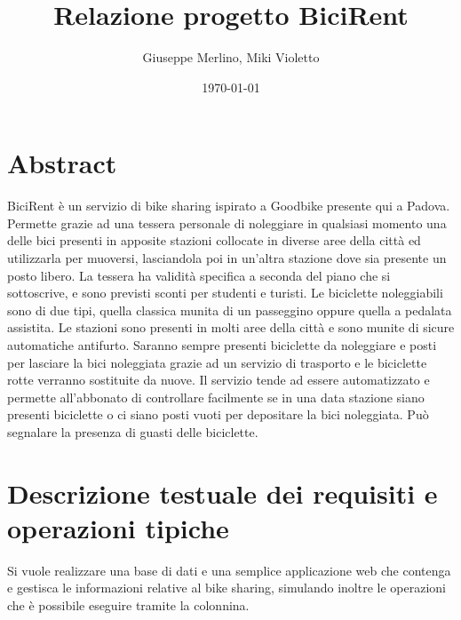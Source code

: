 \documentclass[a4paper,twoside]{article}
\author{Giuseppe Merlino, Miki Violetto}
\title{Relazione progetto BiciRent}
\date{\today}
\begin{document}
\maketitle

\newpage
\tableofcontents
\newpage
\listoffigures
\newpage


\section{Abstract}
BiciRent è un servizio di bike sharing ispirato a Goodbike presente qui a Padova.\newline
Permette grazie ad una tessera personale di noleggiare in qualsiasi momento una delle bici presenti in apposite stazioni collocate in diverse aree della città ed utilizzarla per muoversi, lasciandola poi in un'altra stazione dove sia presente un posto libero.\newline
La tessera ha validità specifica a seconda del piano che si sottoscrive, e sono previsti sconti per studenti e turisti.\newline
Le biciclette noleggiabili sono di due tipi, quella classica munita di un passeggino oppure quella a pedalata assistita.\newline
Le stazioni sono presenti in molti aree della città e sono munite di sicure automatiche antifurto. Saranno sempre presenti biciclette da noleggiare e posti per lasciare la bici noleggiata grazie ad un servizio di trasporto e le biciclette rotte verranno sostituite da nuove.\newline
Il servizio tende ad essere automatizzato e permette all'abbonato di controllare facilmente se in una data stazione siano presenti biciclette o ci siano posti vuoti per depositare la bici noleggiata. Può segnalare la presenza di guasti delle biciclette.\newline

\section{Descrizione testuale dei requisiti e operazioni tipiche}
Si vuole realizzare una base di dati e una semplice applicazione web che contenga e gestisca le informazioni relative al bike sharing, simulando inoltre le operazioni che è possibile eseguire tramite la colonnina.
\end{document}
